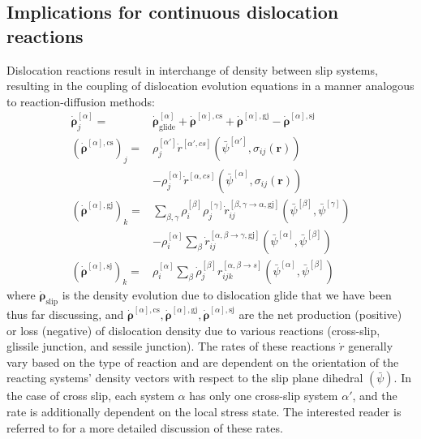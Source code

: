 \subsection{Implications for continuous dislocation reactions}
{Dislocation reactions result in interchange of density between slip systems, resulting in the coupling of dislocation evolution equations in a manner analogous to reaction-diffusion methods:} 
\begin{align}
\dot{\boldsymbol{\rho}}^{[\alpha]}_j=&\dot{\boldsymbol{\rho}}^{[\alpha]}_\text{glide}  +\dot{\boldsymbol{\rho}}^{[\alpha],\text{cs}} +\dot{\boldsymbol{\rho}}^{[\alpha],\text{gj}} -\dot{\boldsymbol{\rho}}^{[\alpha],\text{sj}}\\
(\dot{\boldsymbol{\rho}}^{[\alpha],\text{cs}})_j =& \rho^{[\alpha']}_j\dot{r}^{[\alpha',cs]}\left(\bar{\psi}^{[\alpha']},\sigma_{ij}(\boldsymbol{r})\right) \nonumber \\&- \rho^{[\alpha]}_j\dot{r}^{[\alpha,cs]}\left(\bar{\psi}^{[\alpha]},\sigma_{ij}(\boldsymbol{r})\right)\\
(\dot{\boldsymbol{\rho}}^{[\alpha],\text{gj}})_k =& \sum_{\beta,\gamma} \rho^{[\beta]}_i\rho^{[\gamma]}_j \dot{r}^{[\beta,\gamma\to\alpha, \text{gj}]}_{ij}(\bar\psi^{[\beta]},\bar\psi^{[\gamma]}) \nonumber \\
&- \rho^{[\alpha]}_i\sum_\beta\dot r^{[\alpha,\beta\to \gamma, \text{gj}]}_{ij}(\bar\psi^{[\alpha]},\bar\psi^{[\beta]})\\
(\dot{\boldsymbol{\rho}}^{[\alpha],\text{sj}})_k =&  \rho^{[\alpha]}_i\sum_{\beta}\dot \rho_j^{[\beta]}r^{[\alpha,\beta\to s]}_{ijk}(\bar\psi^{[\alpha]},\bar\psi^{[\beta]})
\end{align}
where $\dot{\boldsymbol{\rho}}_\text{slip}$ is the density evolution due to dislocation glide that we have been thus far discussing, and $\dot{\boldsymbol{\rho}}^{[\alpha],\text{cs}} ,\dot{\boldsymbol{\rho}}^{[\alpha],\text{gj}},\dot{\boldsymbol{\rho}}^{[\alpha],\text{sj}}$ are the net production (positive) or loss (negative) of dislocation density due to various reactions (cross-slip, glissile junction, and sessile junction). The rates of these reactions $\dot r$ generally vary based on the type of reaction and are dependent on the orientation of the reacting systems' density vectors with respect to the slip plane dihedral $(\bar{\psi})$. In the case of cross slip, each system $\alpha$ has only one cross-slip system $\alpha'$, and the rate is additionally dependent on the local stress state. The interested reader is referred to \cite{Vivekanandan2021} for a more detailed discussion of these rates.

